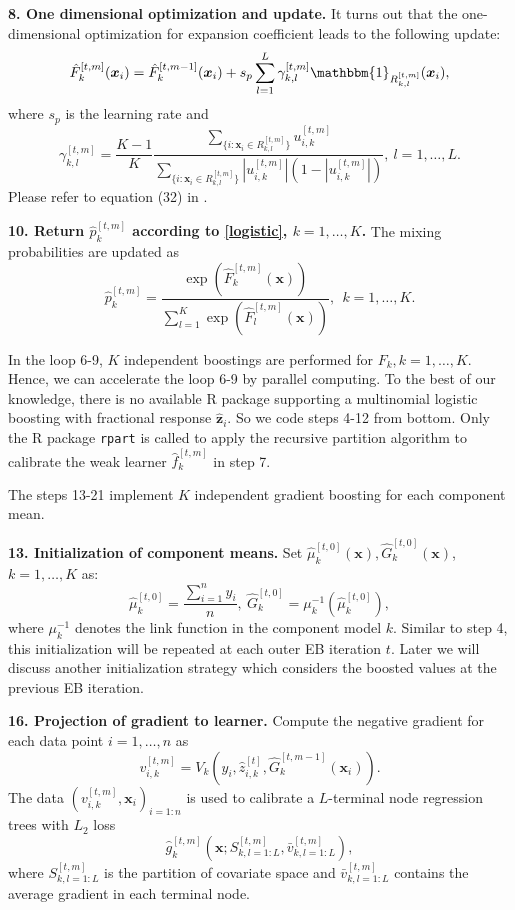 \documentclass[11pt]{article}
\numberwithin{equation}{section}
\def\bx{\boldsymbol{x}}
\def\bz{\boldsymbol{z}}
\begin{document}
{\bf 8. One dimensional optimization and update.}
 It turns out that  the one-dimensional optimization for expansion coefficient leads to the following update:
		$$\hat{F}_k^{[t,m]}(\bx_i)=\hat{F}_k^{[t,m-1]}(\bx_i)+s_p\sum_{l=1}^L\gamma^{[t,m]}_{k,l}\mathbbm{1}_{R^{[t,m]}_{k,l}}(\bx_i),$$
		where $s_p$ is the learning rate and
		$$\gamma^{[t,m]}_{k,l}=\frac{K-1}{K}\frac{\sum_{\{i:\bx_i\in R_{k,l}^{[t,m]}\}}u_{i,k}^{[t,m]}}{\sum_{\{i:\bx_i\in R_{k,l}^{[t,m]}\}}\left|u_{i,k}^{[t,m]}\right|\left(1-\left|u_{i,k}^{[t,m]}\right|\right)}, ~l=1,\ldots,L.$$
Please refer to equation (32) in \citet{friedman2001greedy}.

{\bf 10. Return $\hat{p}_k^{[t,m]}$ according to \eqref{logistic}, $k=1,\ldots,K$.}
The mixing probabilities are updated as
$$\hat{p}_k^{[t,m]}=\frac{\exp\left(\hat{F}^{[t,m]}_k(\bx)\right)}{\sum_{l=1}^{K}\exp\left(\hat{F}^{[t,m]}_l(\bx)\right)},~~k=1,\ldots,K.$$


In the loop 6-9, $K$ independent boostings are performed for $F_k, k=1,\ldots,K$. Hence, we can accelerate the loop 6-9 by parallel computing.
To the best of our knowledge, there is no available R package supporting a multinomial logistic boosting with fractional response $\hat{\bz}_{i}$.
So we code steps 4-12 from bottom. Only the  R package {\tt rpart} is called to apply the recursive partition algorithm to calibrate the weak learner $\hat{f}_k^{[t,m]}$ in step 7.

The steps 13-21 implement $K$ independent gradient boosting for each component mean.

{\bf 13. Initialization of component means.} Set $\hat{\mu}_k^{[t,0]}(\bx),\hat{G}_k^{[t,0]}(\bx)$, $k=1,\ldots,K$ as:
			\begin{equation}\label{ini-2}
				\hat{\mu}_k^{[t,0]}=\frac{\sum_{i=1}^ny_i}{n},~ \hat{G}_k^{[t,0]}=\mu_k^{-1}(\hat{\mu}_k^{[t,0]}),
					\end{equation}
		where $\mu^{-1}_k$ denotes the link function in the component model $k$. 
		Similar to step 4, this initialization will be repeated at each outer EB iteration $t$. Later we will discuss another initialization strategy which considers the boosted values at the previous EB iteration.
	
{\bf 16. Projection of gradient to learner.}
		Compute the negative gradient for each data point $i=1,\ldots,n$ as 
		$$v_{i,k}^{[t,m]}=V_k(y_i,\hat{z}^{[t]}_{i,k},\hat{G}_k^{[t,m-1]}(\bx_i)).$$
		The data $(v_{i,k}^{[t,m]},\bx_i)_{i=1:n}$ is used to calibrate a $L$-terminal node regression trees with $L_2$ loss $$\hat{g}_k^{[t,m]}\left(\bx;S^{[t,m]}_{k,l=1:L},\bar{v}^{[t,m]}_{k,l=1:L}\right),$$
		 where $S^{[t,m]}_{k,l=1:L}$ is the partition of covariate space and $\bar{v}^{[t,m]}_{k,l=1:L}$ contains the average gradient in each terminal node.
		
\end{document}
